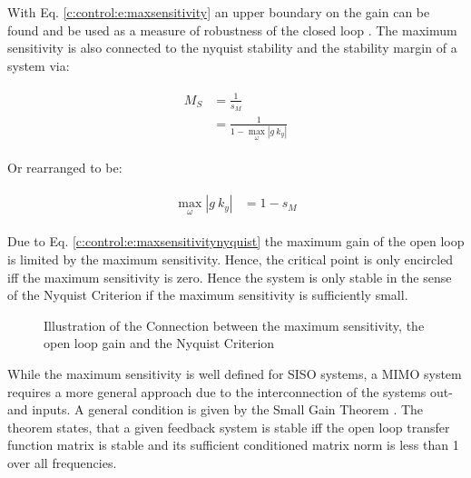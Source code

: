 With Eq. \ref{c:control:e:maxsensitivity} an upper boundary on the gain can be found and be used as a measure of robustness of the closed loop \cite[p.323 ff.]{Astrom2009}. The maximum sensitivity is also connected to the nyquist stability and the stability margin of a system via:

\begin{align}
\begin{split}
M_S &= \frac{1}{s_M} \\
&= \frac{1}{1 - \max_\omega \left| g ~k_y \right|}
\end{split}
\label{c:control:e:maxsensitivitynyquist}
\end{align}

Or rearranged to be:

\begin{align}
\begin{split}
\max_\omega \left| g~k_y\right| &= 1 - s_M
\end{split}
\end{align}

Due to Eq. \ref{c:control:e:maxsensitivitynyquist} the maximum gain of the open loop is limited by the maximum sensitivity. Hence, the critical point is only encircled iff the maximum sensitivity is zero. Hence the system is only stable in the sense of the Nyquist Criterion if the maximum sensitivity is sufficiently small.\\


\begin{figure}[h]\centering

\caption{Illustration of the Connection between the maximum sensitivity, the open loop gain and the Nyquist Criterion}
\label{c:control:f:maxsensitivitynyquist}
\end{figure}


%  


While the maximum sensitivity is well defined for SISO systems, a MIMO system requires a more general approach due to the interconnection of the systems out- and inputs. A general condition is given by the Small Gain Theorem \cite[p.150 ff.]{Skogestad2005}. The theorem states, that a given feedback system is stable iff the open loop transfer function matrix is stable and its sufficient conditioned matrix norm is less than 1 over all frequencies.

